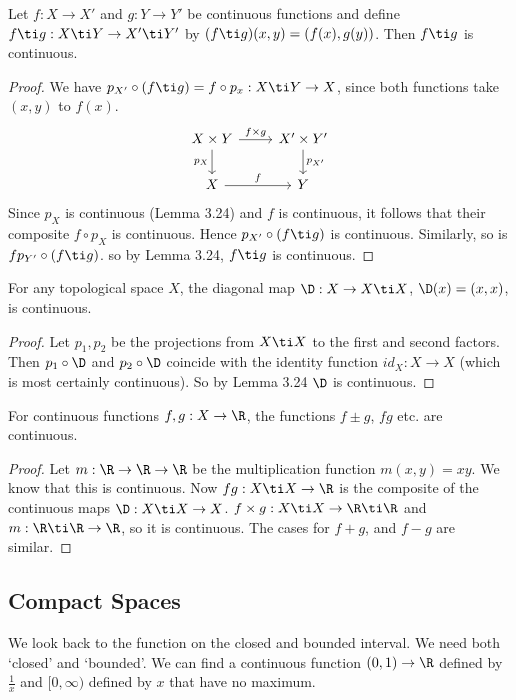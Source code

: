 
\begin{ncor}
   Let $f : X \to X'$ and $g : Y \to Y'$ be continuous functions and define $f \ti g : X\ti Y \to X'\ti Y'$ by $(f \ti g)(x, y) = (f(x), g(y))$. Then $f \ti g$ is continuous.
\end{ncor}
\begin{proof}
  We have $p_{X'}\circ (f \ti g) = f\circ p_x : X \ti Y \to X$, since both functions take $(x, y)$ to $f(x)$.
  \[\begin{tikzcd}
  	{X\times Y} & {X'\times Y'} \\
  	X & Y
  	\arrow["{f\times g}", from=1-1, to=1-2]
  	\arrow["f", from=2-1, to=2-2]
  	\arrow["{p_X}"', from=1-1, to=2-1]
  	\arrow["{p_{X'}}", from=1-2, to=2-2]
  \end{tikzcd}\]
  Since $p_X$ is continuous (Lemma 3.24) and $f$ is continuous, it follows that their composite $f \circ p_X$ is continuous. Hence $p_{X'} \circ (f \ti g)$ is continuous. Similarly, so is $fp_{Y'}\circ (f \ti g)$. so by Lemma 3.24, $f\ti g$ is continuous.
\end{proof}

\begin{ncor}
  For any topological space $X$, the diagonal map $\D : X \to X\ti X$, $\D(x) = (x, x)$, is continuous.
\end{ncor}
\begin{proof}
  Let $p_1, p_2$ be the projections from $X\ti X$ to the first and second factors. Then $p_1 \circ \D$ and $p_2\circ \D$ coincide with the identity function $id_X : X \to X$ (which is most certainly continuous). So by Lemma 3.24 $\D$ is continuous.
\end{proof}

\begin{ncor}
   For continuous functions $f, g : X \to \R$, the functions $f \pm g$, $fg$ etc. are continuous.
\end{ncor}
\begin{proof}
  Let $m : \R \to \R \to \R$ be the multiplication function $m(x, y) = xy$. We know that this is continuous. Now $fg : X \ti X \to \R$ is the composite of the continuous maps $\D : X \ti X \to X$. $f \times g : X\ti X \to \R\ti \R$ and $m : \R \ti \R \to \R$, so it is continuous. The cases for $f + g$, and $f - g$ are similar.
\end{proof}

\subsection{Compact Spaces}
We look back to the function on the closed and bounded interval. We need both `closed' and `bounded'. We can find a continuous function $(0, 1) \to \R$ defined by $\frac{1}{x}$ and $[0, \infty)$ defined by $x$ that have no maximum.\\

